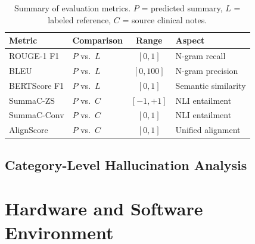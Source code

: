 \documentclass[12pt,a4paper,oneside]{report}
\begin{document}
\begin{table}[htbp]
\centering
\caption{Summary of evaluation metrics. $P$ = predicted summary, $L$ = labeled reference, $C$ = source clinical notes.}
\label{tab:eval-metrics}
\begin{tabular}{llcl}
\toprule
\textbf{Metric} & \textbf{Comparison} & \textbf{Range} & \textbf{Aspect} \\
\midrule
ROUGE-1 F1   & $P$ vs.\ $L$ & $[0, 1]$    & N-gram recall \\
BLEU         & $P$ vs.\ $L$ & $[0, 100]$  & N-gram precision \\
BERTScore F1 & $P$ vs.\ $L$ & $[0, 1]$    & Semantic similarity \\
\midrule
SummaC-ZS    & $P$ vs.\ $C$ & $[-1, +1]$  & NLI entailment \\
SummaC-Conv  & $P$ vs.\ $C$ & $[0, 1]$    & NLI entailment \\
AlignScore   & $P$ vs.\ $C$ & $[0, 1]$    & Unified alignment \\
\bottomrule
\end{tabular}
\end{table}

\subsection{Category-Level Hallucination Analysis}
\label{subsec:category-eval}


\section{Hardware and Software Environment}
\label{sec:hardware}
\end{document}
